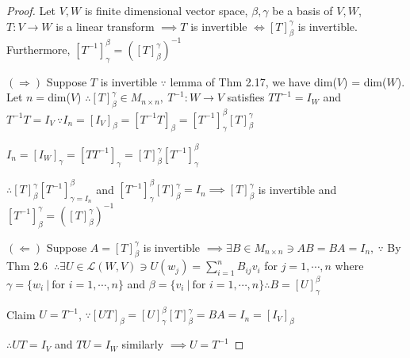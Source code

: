 \begin{proof}
	Let $V,W$ is finite dimensional vector space, $\beta,\gamma$ be a basis of $V,W$, $T: V \rightarrow W$ is a linear transform $\implies T$ is invertible $\Leftrightarrow [T]^{\gamma}_{\beta}$ is invertible. Furthermore, $[T^{-1}]^{\beta}_{\gamma} = ([T]^{\gamma}_{\beta})^{-1} $
	
	$(\Rightarrow) $ Suppose $T$ is invertible $\because$ lemma of Thm 2.17, we have dim($V$) = dim($W$). Let $n = $dim($V$) $\therefore [T]^{\gamma}_{\beta} \in M_{n \times n},~ T^{-1}: W \rightarrow V$ satisfies $TT^{-1} = I_W$ and $T^{-1}T = I_V~ \because I_n = [I_V]_{\beta} = [T^{-1}T]_{\beta} = [T^{-1}]^{\beta}_{\gamma}[T]^{\gamma}_{\beta}$
	
	$I_n = [I_W]_{\gamma} = [TT^{-1}]_{\gamma} = [T]^{\gamma}_{\beta}[T^{-1}]^{\beta}_{\gamma}$
	
	$\therefore [T]^{\gamma}_{\beta}[T^{-1}]^{\beta}_{\gamma = I_n}$ and $[T^{-1}]^{\beta}_{\gamma}[T]^{\gamma}_{\beta} = I_n \implies [T]^{\gamma}_{\beta}$ is invertible and $[T^{-1}]^{\gamma}_{\beta} = ([T]^{\gamma}_{\beta})^{-1}$
	
	$(\Leftarrow)$ Suppose $A = [T]^{\gamma}_{\beta}$ is invertible $\implies \exists B \in M_{n \times n } \ni AB = BA = I_n ,~\because$ By Thm 2.6 $~\therefore \exists U \in \mathscr{L}(W,V) \ni U(w_j) = \sum^n_{i=1}B_{ij}v_i$ for $j = 1,\cdots,n$ where $\gamma = \{w_i ~|~ \text{for } i = 1,\cdots,n\}$ and $\beta = \{v_i ~|~ \text{for } i = 1,\cdots,n\} \therefore B = [U]^{\beta}_{\gamma}$
	
	Claim $U = T^{-1}$, $\because [UT]_{\beta} = [U]^{\beta}_{\gamma}[T]^{\gamma}_{\beta} = BA = I_n = [I_V]_{\beta}$
	
	$\therefore UT = I_V$ and $TU = I_W$ similarly $\implies U = T^{-1}$
\end{proof}
